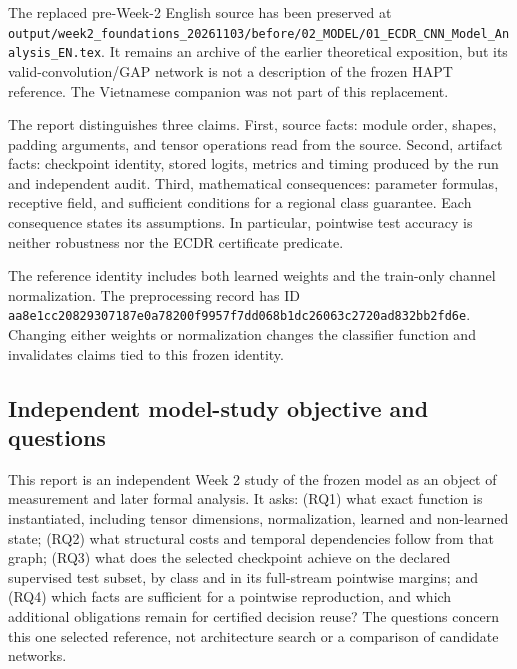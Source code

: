 \documentclass[11pt,a4paper]{article}
\newcommand{\code}[1]{{\small\ttfamily\nolinkurl{#1}}}
\begin{document}
The replaced pre-Week-2 English source has been preserved at \code{output/week2_foundations_20261103/before/02_MODEL/01_ECDR_CNN_Model_Analysis_EN.tex}. It remains an archive of the earlier theoretical exposition, but its valid-convolution/GAP network is not a description of the frozen HAPT reference. The Vietnamese companion was not part of this replacement.

The report distinguishes three claims. First, source facts: module order, shapes, padding arguments, and tensor operations read from the source. Second, artifact facts: checkpoint identity, stored logits, metrics and timing produced by the run and independent audit. Third, mathematical consequences: parameter formulas, receptive field, and sufficient conditions for a regional class guarantee. Each consequence states its assumptions. In particular, pointwise test accuracy is neither robustness nor the ECDR certificate predicate.

The reference identity includes both learned weights and the train-only channel normalization. The preprocessing record has ID \code{aa8e1cc20829307187e0a78200f9957f7dd068b1dc26063c2720ad832bb2fd6e}. Changing either weights or normalization changes the classifier function and invalidates claims tied to this frozen identity.

\subsection{Independent model-study objective and questions}
This report is an independent Week 2 study of the frozen model as an object of measurement and later formal analysis. It asks: (RQ1) what exact function is instantiated, including tensor dimensions, normalization, learned and non-learned state; (RQ2) what structural costs and temporal dependencies follow from that graph; (RQ3) what does the selected checkpoint achieve on the declared supervised test subset, by class and in its full-stream pointwise margins; and (RQ4) which facts are sufficient for a pointwise reproduction, and which additional obligations remain for certified decision reuse? The questions concern this one selected reference, not architecture search or a comparison of candidate networks.
\end{document}
